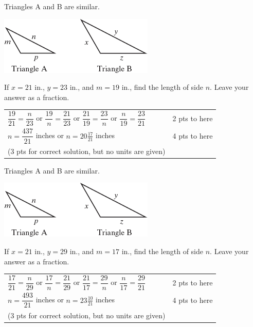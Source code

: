 {
	Triangles A and B are similar.\begin{center}\includegraphics{fig100-09.png}\end{center} If $x=21$ in., $y=23$ in., and $m=19$ in., find the length of side $n$. Leave your answer as a fraction.
}
{
	\begin{tabular}{l r}
	$\dfrac{19}{21}=\dfrac{n}{23}$ or 
	$\dfrac{19}{n}=\dfrac{21}{23}$ or
	$\dfrac{21}{19}=\dfrac{23}{n}$ or 
	$\dfrac{n}{19}=\dfrac{23}{21}$ & 2 pts to here\\
	$n=\dfrac{437}{21}$ inches or $n= 20 \frac{17}{21}$ inches & 4 pts to here \\
	(3 pts for correct solution, but no units are given)
	\end{tabular}
}

{
	Triangles A and B are similar.\begin{center}\includegraphics{fig100-09.png}\end{center} If $x=21$ in., $y=29$ in., and $m=17$ in., find the length of side $n$. Leave your answer as a fraction.
}
{
	\begin{tabular}{l r}
	$\dfrac{17}{21}=\dfrac{n}{29}$ or 
	$\dfrac{17}{n}=\dfrac{21}{29}$ or
	$\dfrac{21}{17}=\dfrac{29}{n}$ or 
	$\dfrac{n}{17}=\dfrac{29}{21}$ & 2 pts to here\\
	$n=\dfrac{493}{21}$ inches or $n= 23 \frac{10}{21}$ inches & 4 pts to here \\
	(3 pts for correct solution, but no units are given)
	\end{tabular}
}

